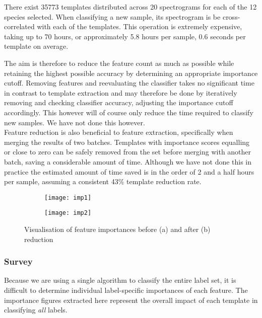 There exist 35773 templates distributed across 20 spectrograms for each
of the 12 species selected.
When classifying a new sample, its spectrogram is be cross-correlated with
each of the templates.
This operation is extremely expensive, taking up to 70 hours, or approximately
5.8 hours per sample, 0.6 seconds per template on average.

The aim is therefore to reduce the feature count as much as possible while
retaining the highest possible accuracy by determining an appropriate importance
cutoff.
Removing features and reevaluating the classifier takes no significant time in
contrast to template extraction and may therefore be done by iteratively removing
and checking classifier accuracy, adjusting the importance cutoff accordingly.
This however will of course only reduce the time required to classify new samples.
We have not done this however.\\

Feature reduction is also beneficial to feature extraction, specifically when
merging the results of two batches.
Templates with importance scores equalling or close to zero can be safely removed
from the set before merging with another batch, saving a considerable amount of time.
Although we have not done this in practice the estimated amount of time saved is
in the order of 2 and a half hours per sample, assuming a consistent 43\%
template reduction rate.

\begin{figure}[!htb]
  \centering
  \begin{subfigure}[b]{1\textwidth}
    \texttt{[image: imp1]}
    \caption{}
    \label{fig:fimp_a}
  \end{subfigure}
  \begin{subfigure}[b]{1\textwidth}
    \texttt{[image: imp2]}
    \caption{}
    \label{fig:fimp_b}
  \end{subfigure}
  \caption{Visualisation of feature importances before (a) and after (b)
    reduction}
  \label{fig:fimp}
\end{figure}


\subsubsection{Survey}
Because we are using a single algorithm to classify the entire label set, it is
difficult to determine individual label-specific importances of each feature.
The importance figures extracted here represent the overall impact of each
template in classifying \emph{all} labels.

